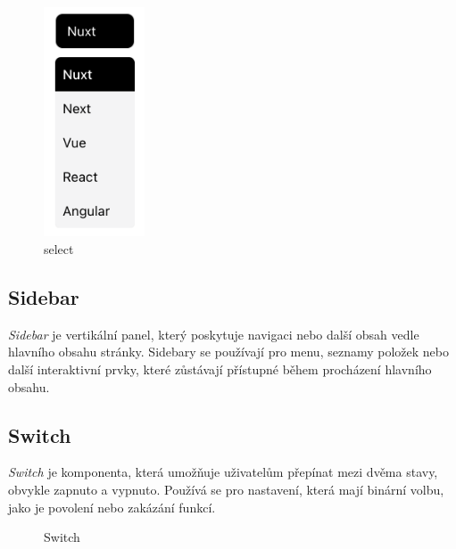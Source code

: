 \begin{figure}[H]
  \centering
  \includegraphics[width=3cm]{images/select}
  \captionsetup{justification=centering,margin=2cm}
  \caption{select} \label{picture:select}
\end{figure}

\subsection{Sidebar}
\emph{Sidebar} je vertikální panel, který poskytuje navigaci nebo další obsah vedle hlavního obsahu stránky. Sidebary se používají pro menu, seznamy položek nebo další interaktivní prvky, které zůstávají přístupné během procházení hlavního obsahu.

\subsection{Switch}
\emph{Switch} je komponenta, která umožňuje uživatelům přepínat mezi dvěma stavy, obvykle zapnuto a vypnuto. Používá se pro nastavení, která mají binární volbu, jako je povolení nebo zakázání funkcí.

\begin{figure}[H]
  \centering
  \hspace{1cm}
  \captionsetup{justification=centering,margin=2cm}
  \caption{Switch}
\end{figure}

